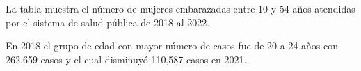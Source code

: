 La tabla muestra el número de mujeres embarazadas entre 10 y 54 años atendidas por el sistema de salud pública de 2018 al 2022. 

En 2018 el grupo de edad con mayor número de casos fue de 20 a 24 años con 262,659 casos y el cual disminuyó 110,587 casos en 2021.


